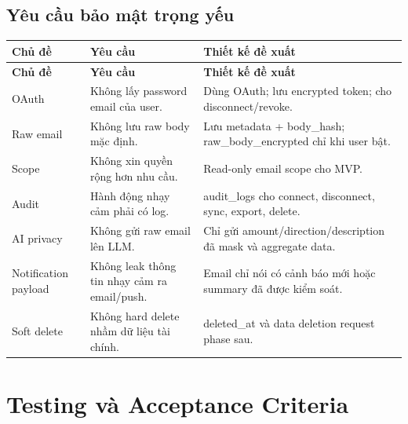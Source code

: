 \documentclass[11pt,a4paper]{article}
\renewcommand{\thead}[1]{\textbf{\color{PrimaryDark}#1}}
\newenvironment{tableblock}{\Needspace{8\baselineskip}\vspace{0.25em}}{\vspace{0.75em}}
\begin{document}
\subsection{Yêu cầu bảo mật trọng yếu}
\begin{tableblock}
\scriptsize
\begin{longtable}{L{3.1cm}L{5.4cm}L{6.7cm}}
\thead{Chủ đề} & \thead{Yêu cầu} & \thead{Thiết kế đề xuất} \\
\endfirsthead
{}\thead{Chủ đề} & \thead{Yêu cầu} & \thead{Thiết kế đề xuất} \\
\endhead
OAuth & Không lấy password email của user. & Dùng OAuth; lưu encrypted token; cho disconnect/revoke. \\
Raw email & Không lưu raw body mặc định. & Lưu metadata + body\_hash; raw\_body\_encrypted chỉ khi user bật. \\
Scope & Không xin quyền rộng hơn nhu cầu. & Read-only email scope cho MVP. \\
Audit & Hành động nhạy cảm phải có log. & audit\_logs cho connect, disconnect, sync, export, delete. \\
AI privacy & Không gửi raw email lên LLM. & Chỉ gửi amount/direction/description đã mask và aggregate data. \\
Notification payload & Không leak thông tin nhạy cảm ra email/push. & Email chỉ nói có cảnh báo mới hoặc summary đã được kiểm soát. \\
Soft delete & Không hard delete nhầm dữ liệu tài chính. & deleted\_at và data deletion request phase sau. \\
\end{longtable}
\end{tableblock}

\section{Testing và Acceptance Criteria}
\end{document}
